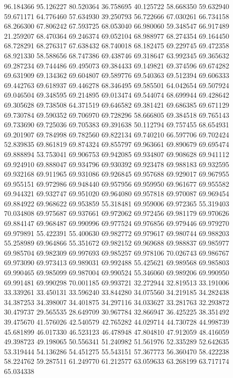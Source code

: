 96.184366
95.126227
80.520364
36.758695
40.125722
58.668350
59.632940
59.671171
64.776460
57.634930
39.250793
56.722666
67.030261
66.734158
68.266300
67.806242
67.593725
68.053040
66.980060
59.348547
66.917489
21.259207
68.470364
69.246374
69.052104
68.988977
68.274354
69.164450
68.728291
68.276317
67.638432
68.740018
68.182475
69.229745
69.472358
68.921330
58.588656
68.747386
69.438746
69.318647
63.992345
69.365632
69.287234
69.744486
69.495073
69.384433
69.149821
69.374596
69.674282
69.631909
69.134362
69.604807
69.589776
69.540363
69.512394
69.606333
69.442763
69.618937
69.446278
68.346495
69.585501
64.042654
69.507924
69.046504
69.348595
69.214895
69.013474
69.544074
68.699944
69.428642
69.305628
69.738508
64.371519
69.646582
69.381421
69.686385
69.671129
69.730784
69.590352
69.706970
69.728296
58.666805
69.384518
69.765143
69.733690
69.725036
69.705383
69.391638
50.112794
69.757455
68.654931
69.201907
69.784998
69.782560
69.822134
69.740210
66.597706
69.702424
52.839835
69.861819
69.874324
69.855797
69.963661
69.890679
69.695474
69.888894
53.753041
69.906753
69.942085
69.934807
69.908628
69.941112
69.924910
69.888047
69.934796
69.930392
69.923478
69.988183
69.932595
69.932168
69.911965
69.931086
69.926845
69.957688
69.929017
69.967955
69.955151
69.972986
69.948440
69.957956
69.959950
69.961677
69.955582
69.944321
69.932747
69.951020
69.964080
69.957818
69.970087
69.969454
69.884922
69.968622
69.953859
55.318481
69.959006
69.972365
55.319403
70.034808
69.975687
69.937661
69.972062
69.972456
69.981179
69.970626
69.884147
69.968487
69.990996
69.977524
69.976856
69.979446
69.979270
69.979891
55.422391
55.400630
69.982772
69.979617
69.980744
69.988203
55.258989
69.964866
55.351672
69.982152
69.969688
69.988837
69.985977
69.985704
69.982309
69.997693
69.985257
69.978106
70.026743
69.986767
69.973090
69.973413
69.989031
69.992488
55.425621
69.989568
69.985803
69.990465
69.985099
69.987004
69.990524
55.346060
69.989206
69.990950
69.991481
69.990298
70.001185
69.993721
32.272944
32.819513
33.191006
33.339261
33.450131
33.596240
33.844280
34.075560
34.219185
34.282438
34.387253
34.398007
34.401875
34.297116
34.033627
33.281763
32.293872
30.479737
29.565535
28.649709
30.967784
32.866947
36.425225
38.351492
39.475670
41.576026
42.540579
42.765282
44.029714
44.730728
44.998739
45.681899
46.017330
46.523123
46.478948
47.804810
47.912059
48.416059
49.398723
49.198065
50.556341
51.240982
51.561976
52.335289
52.642635
53.319444
54.136286
54.451275
55.543151
57.367773
56.360470
58.422238
58.224762
59.287511
61.249770
61.212577
63.059633
63.268199
63.717174
65.034338
